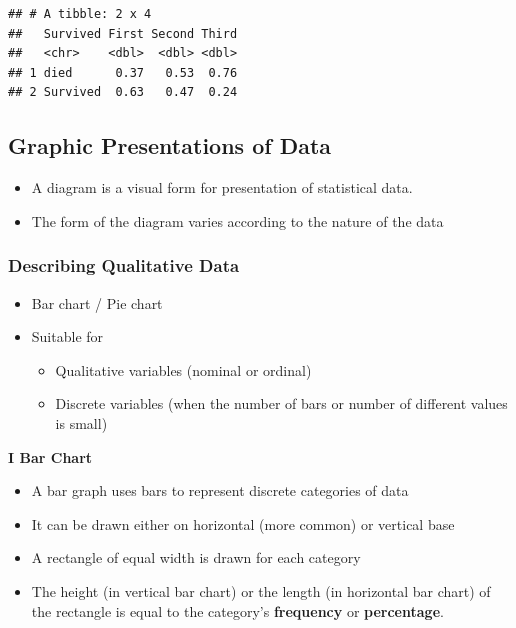 \documentclass[]{book}
\providecommand{\tightlist}{%
  \setlength{\itemsep}{0pt}\setlength{\parskip}{0pt}}
\begin{document}
\begin{verbatim}
## # A tibble: 2 x 4
##   Survived First Second Third
##   <chr>    <dbl>  <dbl> <dbl>
## 1 died      0.37   0.53  0.76
## 2 Survived  0.63   0.47  0.24
\end{verbatim}

\newpage

\hypertarget{graphic-presentations-of-data}{%
\subsection{Graphic Presentations of Data}\label{graphic-presentations-of-data}}

\begin{itemize}
\tightlist
\item
  A diagram is a visual form for presentation of statistical data.
\item
  The form of the diagram varies according to the nature of the data
\end{itemize}

\hypertarget{describing-qualitative-data}{%
\subsubsection{Describing Qualitative Data}\label{describing-qualitative-data}}

\begin{itemize}
\tightlist
\item
  Bar chart / Pie chart
\item
  Suitable for

  \begin{itemize}
  \tightlist
  \item
    Qualitative variables (nominal or ordinal)
  \item
    Discrete variables (when the number of bars or number of different values is small)
  \end{itemize}
\end{itemize}

\textbf{I Bar Chart}

\begin{itemize}
\tightlist
\item
  A bar graph uses bars to represent discrete categories of data
\item
  It can be drawn either on horizontal (more common) or vertical base
\item
  A rectangle of equal width is drawn for each category
\item
  The height (in vertical bar chart) or the length (in horizontal bar chart) of the rectangle is equal to the category's \textbf{frequency} or \textbf{percentage}.
\end{itemize}
\end{document}
